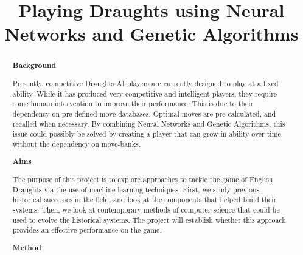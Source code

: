 \documentclass[12pt,a4paper]{article}
\title{Playing Draughts using Neural Networks and Genetic Algorithms}
\author{}
\date{}
\begin{document}
\maketitle
\begin{abstract}


    {\bf Background}

    Presently, competitive Draughts AI players are currently designed to play at a fixed ability. While it has produced very competitive and intelligent players, they require some human intervention to improve their performance. 
    This is due to their dependency on pre-defined move databases. Optimal moves are pre-calculated, and recalled when necessary. By combining Neural Networks and Genetic Algorithms, this issue could possibly be solved by creating a player that can grow in ability over time, without the dependency on move-banks.
    
    {\bf Aims}

    The purpose of this project is to explore approaches to tackle the game of English Draughts via the use of machine learning techniques. First, we study previous historical successes in the field, and look at the components that helped build their systems. Then, we look at contemporary methods of computer science that could be used to evolve the historical systems. The project will establish whether this approach provides an effective performance on the game.
    
    {\bf Method}



\end{abstract}
\end{document}
